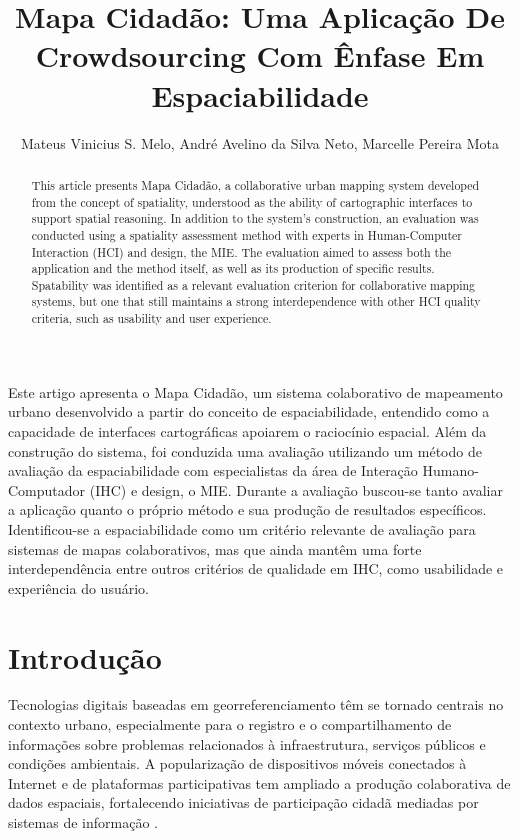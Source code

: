 \documentclass[12pt]{article}
\title{Mapa Cidadão: Uma Aplicação De Crowdsourcing Com Ênfase Em Espaciabilidade}
\author{
Mateus Vinicius S. Melo\inst{1},
André Avelino da Silva Neto\inst{1},
Marcelle Pereira Mota\inst{1}
}
\begin{document}
\maketitle

\begin{abstract}
  This article presents Mapa Cidadão, a collaborative urban mapping system developed from the concept of spatiality, understood as the ability of cartographic interfaces to support spatial reasoning. In addition to the system's construction, an evaluation was conducted using a spatiality assessment method with experts in Human-Computer Interaction (HCI) and design, the MIE. The evaluation aimed to assess both the application and the method itself, as well as its production of specific results. Spatability was identified as a relevant evaluation criterion for collaborative mapping systems, but one that still maintains a strong interdependence with other HCI quality criteria, such as usability and user experience.
\end{abstract}
     
\begin{resumo} 
Este artigo apresenta o Mapa Cidadão, um sistema colaborativo de mapeamento urbano desenvolvido a partir do conceito de espaciabilidade, entendido como a capacidade de interfaces cartográficas apoiarem o raciocínio espacial. Além da construção do sistema, foi conduzida uma avaliação utilizando um método de avaliação da espaciabilidade com especialistas da área de Interação Humano-Computador (IHC) e design, o MIE. Durante a avaliação buscou-se tanto avaliar a aplicação quanto o próprio método e sua produção de resultados específicos. Identificou-se a espaciabilidade como um critério relevante de avaliação para sistemas de mapas colaborativos, mas que ainda mantêm uma forte interdependência entre outros critérios de qualidade em IHC, como usabilidade e experiência do usuário.
\end{resumo}


\section{Introdução}

Tecnologias digitais baseadas em georreferenciamento têm se tornado centrais no contexto urbano, especialmente para o registro e o compartilhamento de informações sobre problemas relacionados à infraestrutura, serviços públicos e condições ambientais. A popularização de dispositivos móveis conectados à Internet e de plataformas participativas tem ampliado a produção colaborativa de dados espaciais, fortalecendo iniciativas de participação cidadã mediadas por sistemas de informação \cite{estelles:2015,alter:2018}.
\end{document}
